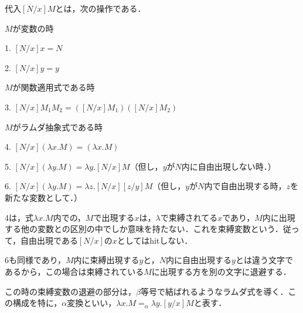 \documentclass[uplatex, dvipdfmx]{jsreport}
\begin{document}
\begin{definition}[代入の形式的定義]代入$[N/x]M$とは，次の操作である．
    
    $M$が変数の時

    1. $[N/x]x=N$

    2. $[N/x]y=y$

    $M$が関数適用式である時

    3. $[N/x]M_1M_2=([N/x]M_1)([N/x]M_2)$

    $M$がラムダ抽象式である時

    4. $[N/x](\lambda x.M)=(\lambda x.M)$

    5. $[N/x](\lambda y.M)=\lambda y.[N/x]M$（但し，$y$が$N$内に自由出現しない時．）

    6. $[N/x](\lambda y.M)=\lambda z.[N/x][z/y]M$（但し，$y$が$N$内で自由出現する時，$z$を新たな変数として．）
\end{definition}
\begin{remark}
    4は，式$\lambda x.M$内での，$M$で出現する$x$は，$\lambda$で束縛されてる$x$であり，$M$内に出現する他の変数との区別の中でしか意味を持たない．これを束縛変数という．従って，自由出現である$[N/x]$の$x$としてはhitしない．

    6も同様であり，$M$内に束縛出現する$y$と，$N$内に自由出現する$y$とは違う文字であるから，この場合は束縛されている$M$に出現する方を別の文字に退避する．
    
    この時の束縛変数の退避の部分は，$\beta$等号で結ばれるようなラムダ式を導く．この構成を特に，$\alpha$変換といい，$\lambda x.M=_\alpha \lambda y.[y/x]M$と表す．
\end{remark}
\end{document}
